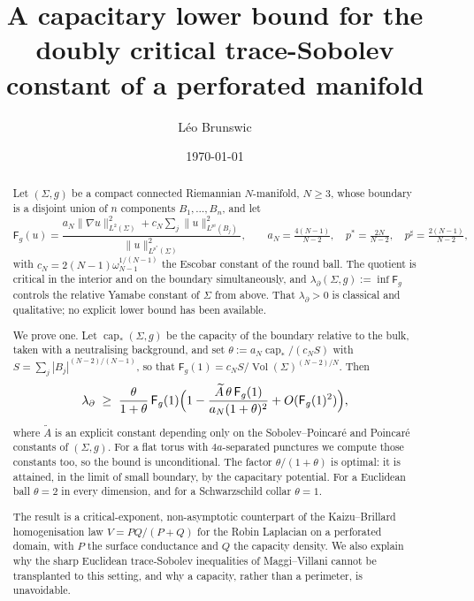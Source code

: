 \documentclass[11pt,reqno]{amsart}
\theoremstyle{plain}
\theoremstyle{definition}
\newcommand{\aN}{a_N}
\newcommand{\cN}{c_N}
\newcommand{\pstar}{p^{*}}
\newcommand{\psharp}{p^{\sharp}}
\newcommand{\Vol}{\operatorname{Vol}}
\newcommand{\cpstar}{\operatorname{cap}_{*}}
\newcommand{\Fq}{\mathsf{F}}
\newcommand{\Atil}{\widetilde{A}}
\begin{document}
\title[The trace-Sobolev constant of a perforated manifold]
      {A capacitary lower bound for the doubly critical trace-Sobolev constant
       of a perforated manifold}

\author{Léo Brunswic}
\address{Centre de Recherche Astrophysique de Lyon, UMR5574,
         ENS de Lyon, Université Claude Bernard Lyon 1, CNRS,
         F--69007 Lyon, France}

\date{\today}


\begin{abstract}
Let $(\Sigma,g)$ be a compact connected Riemannian $N$-manifold, $N\ge3$, whose
boundary is a disjoint union of $n$ components $B_1,\dots,B_n$, and let
\[
  \Fq_g(u)=\frac{\aN\|\nabla u\|_{L^2(\Sigma)}^2
                 +\cN\sum_{j}\|u\|^2_{L^{\psharp}(B_j)}}
                {\|u\|^2_{L^{\pstar}(\Sigma)}},
  \qquad
  \aN=\tfrac{4(N-1)}{N-2},\quad \pstar=\tfrac{2N}{N-2},\quad
  \psharp=\tfrac{2(N-1)}{N-2},
\]
with $\cN=2(N-1)\omega_{N-1}^{1/(N-1)}$ the Escobar constant of the round ball.
The quotient is critical in the interior and on the boundary simultaneously, and
$\lambda_\partial(\Sigma,g):=\inf\Fq_g$ controls the relative Yamabe constant of
$\Sigma$ from above. That $\lambda_\partial>0$ is classical and qualitative; no
explicit lower bound has been available.

We prove one. Let $\cpstar(\Sigma,g)$ be the capacity of the boundary relative to
the bulk, taken with a neutralising background, and set
$\theta:=\aN\cpstar/(\cN S)$ with $S=\sum_j|B_j|^{(N-2)/(N-1)}$, so that
$\Fq_g(1)=\cN S/\Vol(\Sigma)^{(N-2)/N}$. Then
\[
  \lambda_\partial\;\ge\;\frac{\theta}{1+\theta}\,\Fq_g(1)
      \Bigl(1-\frac{\Atil\,\theta\,\Fq_g(1)}{\aN(1+\theta)^{2}}+O(\Fq_g(1)^2)\Bigr),
\]
where $\Atil$ is an explicit constant depending only on the Sobolev--Poincaré and
Poincaré constants of $(\Sigma,g)$. For a flat torus with $4a$-separated punctures we
compute those constants too, so the bound is unconditional. The factor
$\theta/(1+\theta)$ is optimal: it
is attained, in the limit of small boundary, by the capacitary potential. For a
Euclidean ball $\theta=2$ in every dimension, and for a Schwarzschild collar
$\theta=1$.

The result is a critical-exponent, non-asymptotic counterpart of the
Kaizu--Brillard homogenisation law $V=PQ/(P+Q)$ for the Robin Laplacian on a
perforated domain, with $P$ the surface conductance and $Q$ the capacity density.
We also explain why the sharp Euclidean trace-Sobolev inequalities of
Maggi--Villani cannot be transplanted to this setting, and why a capacity, rather
than a perimeter, is unavoidable.
\end{abstract}
\end{document}
